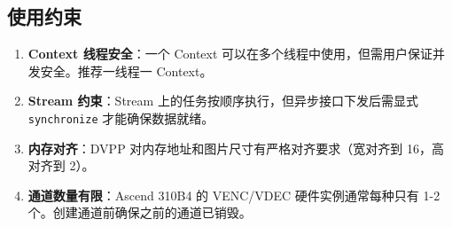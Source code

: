 \subsection{使用约束}\label{src-book-chapter6-h161}

\begin{enumerate}
\def\labelenumi{\arabic{enumi}.}
\tightlist
\item
  \textbf{Context 线程安全}：一个 Context
  可以在多个线程中使用，但需用户保证并发安全。推荐一线程一 Context。
\item
  \textbf{Stream 约束}：Stream
  上的任务按顺序执行，但异步接口下发后需显式
  \passthrough{\lstinline!synchronize!} 才能确保数据就绪。
\item
  \textbf{内存对齐}：DVPP 对内存地址和图片尺寸有严格对齐要求（宽对齐到
  16，高对齐到 2）。
\item
  \textbf{通道数量有限}：Ascend 310B4 的 VENC/VDEC 硬件实例通常每种只有
  1-2 个。创建通道前确保之前的通道已销毁。
\end{enumerate}
